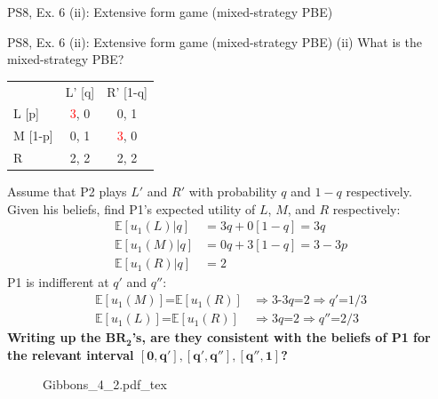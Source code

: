 \begin{frame}{PS8, Ex. 6 (ii): Extensive form game (mixed-strategy PBE)}
\begin{multicols}{2}
      \vfill\null
    \end{multicols}
\end{frame}
\begin{frame}{PS8, Ex. 6 (ii): Extensive form game (mixed-strategy PBE)}
    (ii) What is the mixed-strategy PBE? \vspace{-8pt}
    \begin{multicols}{2}
      \begin{table}
        \begin{tabular}{l|c|c|}
          \multicolumn{1}{c}{} & \multicolumn{1}{c}{L' [q]} & \multicolumn{1}{c}{R' [1-q]} \\\cline{2-3}
          L [p]   & \textcolor{red}{3}, 0 & 0, \color{blue}1 \\\cline{2-3}
          M [1-p] & 0, \color{blue}1 & \textcolor{red}{3}, 0 \\\cline{2-3}
          R       & 2, \color{blue}2 & 2, \color{blue}2 \\\cline{2-3}
        \end{tabular}
      \end{table} \vspace{-4pt}
      Assume that P2 plays $L'$ and $R'$ with probability $q$ and $1-q$ respectively.\\\smallskip
      Given his beliefs, find P1's expected utility of $L$, $M$, and $R$ respectively: \vspace{-4pt}
      \begin{align*}
        \mathbb{E}[u_1(L)|q]&=3q+0[1-q]=3q\\
        \mathbb{E}[u_1(M)|q]&=0q+3[1-q]=3-3p\\
        \mathbb{E}[u_1(R)|q]&=2
      \end{align*}
      P1 is indifferent at $q'$ and $q''$: \vspace{-6pt}
      \begin{align*}
        \mathbb{E}[u_1(M)]\text{=}\mathbb{E}[u_1(R)]&\Rightarrow \text{3-3}q\text{=}2\Rightarrow q'\text{=}1/3\\
        \mathbb{E}[u_1(L)]\text{=}\mathbb{E}[u_1(R)]&\Rightarrow 3q\text{=}2\Rightarrow q''\text{=}2/3
      \end{align*}
      \textbf{Writing up the $\bm{BR_2}$'s, are they consistent with the beliefs of P1 for the relevant interval $\bm{[0,q'],[q',q''],[q'',1]}$?}
      \vfill\null\columnbreak
      \begin{figure}[!h]
        \center {}
        {Gibbons_4_2.pdf_tex}

\end{figure}
\end{multicols}
\end{frame}

